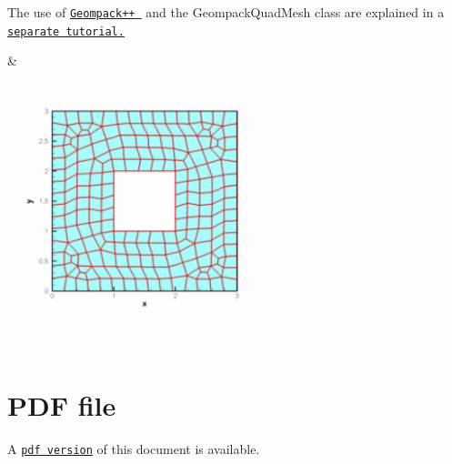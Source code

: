 \begin{center}
\begin{longtabu}
\begin{DoxyItemize}
\item The use of \href{http://members.shaw.ca/bjoe/}{\tt {\ttfamily Geompack++} } and the {\ttfamily Geompack\+Quad\+Mesh} class are explained in a \href{../../mesh_from_geompack/html/index.html}{\tt separate tutorial.}
\end{DoxyItemize}& 
\begin{DoxyImageNoCaption}
  \mbox{\includegraphics[width=0.75\textwidth]{geompack_mesh}}
\end{DoxyImageNoCaption}
   \\
\end{longtabu}
\end{center} 



 

 \hypertarget{index_pdf}{}\section{P\+D\+F file}\label{index_pdf}
A \href{../latex/refman.pdf}{\tt pdf version} of this document is available. 
